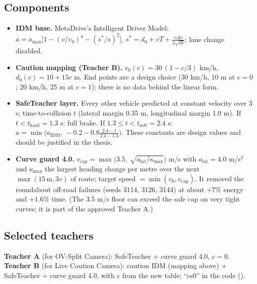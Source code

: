 \documentclass[11pt,a4paper]{article}
\newcommand{\code}[1]{\texttt{\detokenize{#1}}}
\begin{document}
\subsection{Components}
\begin{itemize}[leftmargin=*]
\item \textbf{IDM base.} MetaDrive's Intelligent Driver Model: $a=a_{\max}\big[1-(v/v_0)^4-(s^{*}/s)^2\big]$, $s^{*}=d_0+vT+\frac{v\Delta v}{2\sqrt{ab}}$; lane change disabled.
\item \textbf{Caution mapping (Teacher B).} $v_0(c)=30\,(1-c/3)$ km/h, $d_0(c)=10+15c$ m. End points are a design choice (30 km/h, 10 m at $c=0$; 20 km/h, 25 m at $c=1$); there is no data behind the linear form.
\item \textbf{SafeTeacher layer.} Every other vehicle predicted at constant velocity over 3 s; time-to-collision $t$ (lateral margin 0.35 m, longitudinal margin 1.0 m). If $t<t_{\text{hard}}=1.3$ s: full brake. If $1.3\le t<t_{\text{soft}}=2.4$ s: $a=\min\!\big(a_{\text{IDM}},\,-0.2-0.8\frac{2.4-t}{2.4-1.3}\big)$. These constants are design values and should be justified in the thesis.
\item \textbf{Curve guard 4.0.} $v_{\text{cap}}=\max\!\big(3.5,\ \sqrt{a_{\text{lat}}/\kappa_{\max}}\big)$ m/s with $a_{\text{lat}}=4.0$ m/s$^2$ and $\kappa_{\max}$ the largest heading change per metre over the next $\max(15\,\text{m},3v)$ of route; target speed $=\min(v_0,v_{\text{cap}})$. It removed the roundabout off-road failures (seeds 3114, 3126, 3144) at about $+7\%$ energy and $+1.6\%$ time. (The 3.5 m/s floor can exceed the safe cap on very tight curves; it is part of the approved Teacher A.)
\end{itemize}
\subsection{Selected teachers}
\textbf{Teacher A} (for OV-Split Camera): SafeTeacher + curve guard 4.0, $c=0$. \textbf{Teacher B} (for Live Caution Camera): caution IDM (mapping above) + SafeTeacher + curve guard 4.0, with $c$ from the new table; ``cs0'' in the code (\code{cs0_g4.0}).
\end{document}
